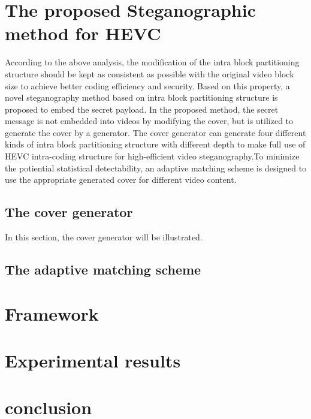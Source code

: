 \documentclass[journal,sort]{IEEEtran}
\begin{document}
\section{The proposed Steganographic method for HEVC}
According to the above analysis, the modification of the intra block partitioning structure should be kept as consistent as possible with the original video block size to achieve better coding efficiency and security. Based on this property, a novel steganography method based on intra block partitioning structure is proposed to embed the secret payload. In the proposed method, the secret message is not embedded into videos by modifying the cover, but is utilized to generate the cover by a generator. The cover generator can generate four different kinds of intra block partitioning structure with different depth to make full use of HEVC intra-coding structure for high-efficient video steganography.To minimize the potiential statistical detectability, an adaptive matching scheme is designed to use the appropriate generated cover for different video content.
\subsection{The cover generator}
In this section, the cover generator will be illustrated.
\subsection{The adaptive matching scheme}
\section{Framework}



\section{Experimental results}
\section{conclusion}




	
	
	
	
	
	
	
\end{document}
